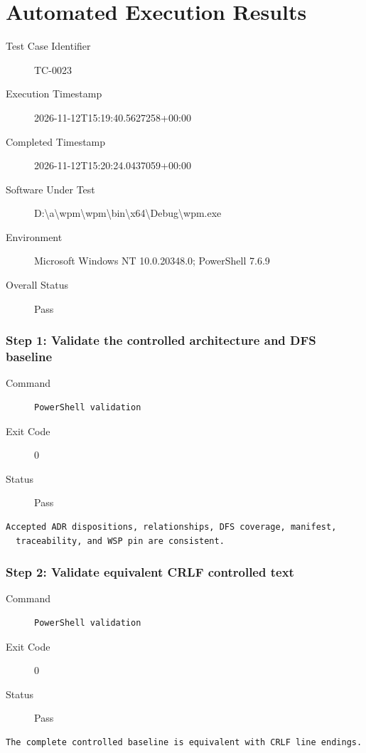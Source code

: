 \section*{Automated Execution Results}
\begin{description}
\item[Test Case Identifier] TC-0023
\item[Execution Timestamp] 2026-11-12T15:19:40.5627258+00:00
\item[Completed Timestamp] 2026-11-12T15:20:24.0437059+00:00
\item[Software Under Test] D:\textbackslash{}a\textbackslash{}wpm\textbackslash{}wpm\textbackslash{}bin\textbackslash{}x64\textbackslash{}Debug\textbackslash{}wpm.exe
\item[Environment] Microsoft Windows NT 10.0.20348.0; PowerShell 7.6.9
\item[Overall Status] Pass
\end{description}
\subsubsection*{Step 1: Validate the controlled architecture and DFS baseline}
\begin{description}
\item[Command] \mbox{}
\begin{verbatim}
PowerShell validation
\end{verbatim}
\item[Exit Code] 0
\item[Status] Pass
\end{description}
\begin{verbatim}
Accepted ADR dispositions, relationships, DFS coverage, manifest,
  traceability, and WSP pin are consistent.
\end{verbatim}
\subsubsection*{Step 2: Validate equivalent CRLF controlled text}
\begin{description}
\item[Command] \mbox{}
\begin{verbatim}
PowerShell validation
\end{verbatim}
\item[Exit Code] 0
\item[Status] Pass
\end{description}
\begin{verbatim}
The complete controlled baseline is equivalent with CRLF line endings.
\end{verbatim}
